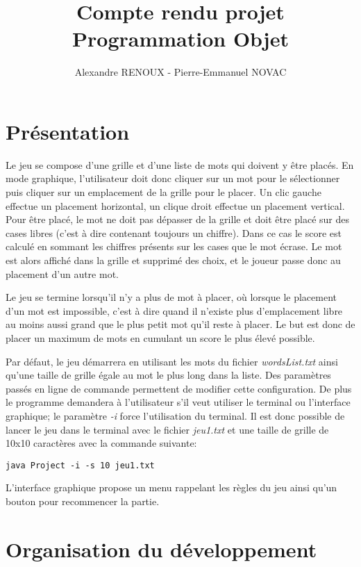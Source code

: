 \documentclass{article}
\title{Compte rendu projet Programmation Objet}
\author{Alexandre RENOUX - Pierre-Emmanuel NOVAC}
\begin{document}
\maketitle

\section{Présentation}

Le jeu se compose d'une grille et d'une liste de mots qui doivent y être placés. En mode graphique, l'utilisateur doit donc cliquer sur un mot pour le sélectionner puis cliquer sur un emplacement de la grille pour le placer. Un clic gauche effectue un placement horizontal, un clique droit effectue un placement vertical. Pour être placé, le mot ne doit pas dépasser de la grille et doit être placé sur des cases libres (c'est à dire contenant toujours un chiffre). Dans ce cas le score est calculé en sommant les chiffres présents sur les cases que le mot écrase. Le mot est alors affiché dans la grille et supprimé des choix, et le joueur passe donc au placement d'un autre mot.

Le jeu se termine lorsqu'il n'y a plus de mot à placer, où lorsque le placement d'un mot est impossible, c'est à dire quand il n'existe plus d'emplacement libre au moins aussi grand que le plus petit mot qu'il reste à placer. Le but est donc de placer un maximum de mots en cumulant un score le plus élevé possible.

Par défaut, le jeu démarrera en utilisant les mots du fichier \textit{wordsList.txt} ainsi qu'une taille de grille égale au mot le plus long dans la liste. Des paramètres passés en ligne de commande permettent de modifier cette configuration. De plus le programme demandera à l'utilisateur s'il veut utiliser le terminal ou l'interface graphique; le paramètre \textit{-i} force l'utilisation du terminal. Il est donc possible de lancer le jeu dans le terminal avec le fichier \textit{jeu1.txt} et une taille de grille de 10x10 caractères avec la commande suivante:
\begin{lstlisting}
java Project -i -s 10 jeu1.txt
\end{lstlisting}

L'interface graphique propose un menu rappelant les règles du jeu ainsi qu'un bouton pour recommencer la partie.

\section{Organisation du développement}
\end{document}
